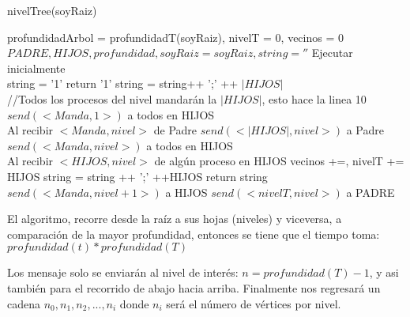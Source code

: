\begin{algorithm}
\caption{nivelTree(soyRaiz)}\label{alg:cap}
\begin{algorithmic}[1]
\State profundidadArbol = profundidadT(soyRaiz), nivelT = 0, vecinos = 0
\State $PADRE, HIJOS, profundidad, soyRaiz=soyRaiz, string = ''$
\State Ejecutar inicialmente\\
    \State string = '1'
    return '1'
    \Else
        \State string = string++ ';' ++ $|HIJOS|$\\
        //Todos los procesos del nivel mandarán la $|HIJOS|$, esto hace la linea 10
        \State $send(<Manda, 1>)$ a todos en HIJOS
    \EndIf
\EndIf\\
\State Al recibir $<Manda, nivel>$ de Padre
    \State  $send(< |HIJOS|, nivel>)$ a Padre
\Else
    \State  $send(<Manda, nivel>)$ a todos en HIJOS
\EndIf\\
\State Al recibir $<HIJOS, nivel>$ de algún proceso en HIJOS
\State vecinos +=, nivelT += HIJOS
        \State string = string ++ ';' ++HIJOS
            \State return string
        \Else
            \State $send(<Manda, nivel+1>)$ a HIJOS
        \EndIf
    \Else
        \State $send(<nivelT, nivel>)$ a PADRE
    \EndIf
\EndIf
\end{algorithmic}
\end{algorithm}

\newpage
El algoritmo, recorre desde la raíz a sus hojas (niveles) y viceversa, a
comparación de la mayor profundidad, entonces se tiene que el tiempo toma:
$profundidad(t)*profundidad(T)$

Los mensaje solo se enviarán al nivel de interés: $n =profundidad(T)-1$,
y asi también para el recorrido de abajo hacia arriba. Finalmente nos regresará
un cadena $n_0,n_1,n_2,...,n_i$ donde $n_i$ será el número de vértices por nivel.

